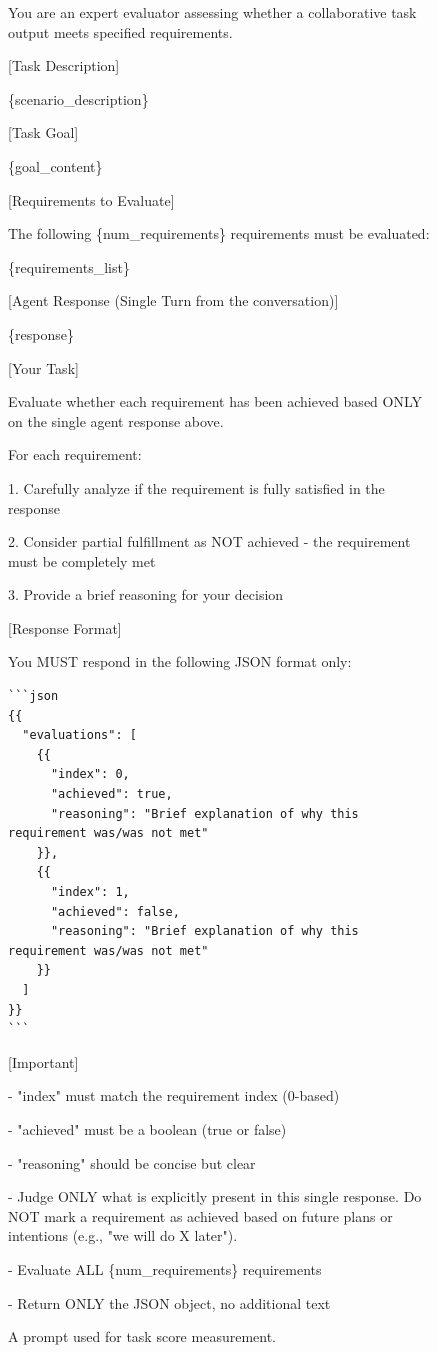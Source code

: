\clearpage
\begin{figure}[t]
\centering
\begin{tcolorbox}[
  colframe=black,
  colback=gray!10,
  arc=2mm,
  boxrule=1.5pt,
  title=\textbf{Prompts},
  fonttitle=\bfseries,
]
\small
You are an expert evaluator assessing whether a collaborative task output meets specified requirements.

[Task Description]

\{scenario\_description\}

[Task Goal]

\{goal\_content\}

[Requirements to Evaluate]

The following \{num\_requirements\} requirements must be evaluated:

\{requirements\_list\}

[Agent Response (Single Turn from the conversation)]

\{response\}

[Your Task]

Evaluate whether each requirement has been achieved based ONLY on the single agent response above.

For each requirement:

1. Carefully analyze if the requirement is fully satisfied in the response

2. Consider partial fulfillment as NOT achieved - the requirement must be completely met

3. Provide a brief reasoning for your decision

[Response Format]

You MUST respond in the following JSON format only:

\begin{verbatim}
```json
{{
  "evaluations": [
    {{
      "index": 0,
      "achieved": true,
      "reasoning": "Brief explanation of why this requirement was/was not met"
    }},
    {{
      "index": 1,
      "achieved": false,
      "reasoning": "Brief explanation of why this requirement was/was not met"
    }}
  ]
}}
```
\end{verbatim}

[Important]

- "index" must match the requirement index (0-based)

- "achieved" must be a boolean (true or false)

- "reasoning" should be concise but clear

- Judge ONLY what is explicitly present in this single response. Do NOT mark a requirement as achieved based on future plans or intentions (e.g., "we will do X later").

- Evaluate ALL \{num\_requirements\} requirements

- Return ONLY the JSON object, no additional text


\end{tcolorbox}
\caption{A prompt used for task score measurement.}
\label{fig:prompt_task}
\end{figure}